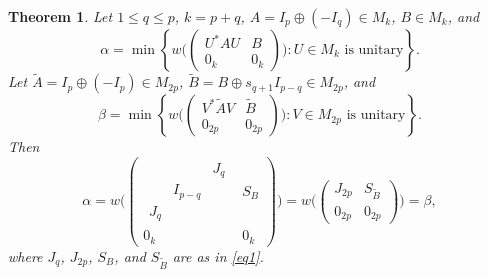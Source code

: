 \documentclass[10pt,a4paper]{amsart}
\newtheorem{theorem}{Theorem}
\begin{document}
\begin{theorem}\label{t36}
Let $1\le q\le p$, $k=p+q$, $A=I_p\oplus(-I_q)\in M_k$, $B\in M_k$, and
$$\alpha=\min\left\{w\Big(\begin{pmatrix} U^*AU & B\\ 0_k & 0_k\end{pmatrix}\Big) : U\in M_k \mbox{ is unitary}\right\}.$$
Let  $\tilde{ A} = I_p \oplus (-I_p)\in M_{2p}$, $\tilde{B} = B \oplus s_{q+1}I_{p-q}\in M_{2p}$, and
$$\beta=\min\left\{w\Big(\begin{pmatrix} V^* \tilde{A}V & \tilde{B}\\ 0_{2p} & 0_{2p}\end{pmatrix}\Big) : V\in M_{2p} \mbox{ is unitary}\right\}.$$
Then
$$
\alpha=w\Big(\left(\begin{array}{c|c}\begin{array}{ccc}  & & J_q\\ & I_{p-q} & \\ J_q & & \end{array} & S_B
\\ \hline 0_k & 0_k\end{array}\right)\Big)
= w\Big(\begin{pmatrix}
J_{2p} & S_{\tilde{B}} \\ 0_{2p} & 0_{2p}
\end{pmatrix}\Big)=\beta,
$$
where $J_q$, $J_{2p}$, $S_B$, and $S_{\tilde{B}}$ are as in \eqref{eq1}.
\end{theorem}
\end{document}
